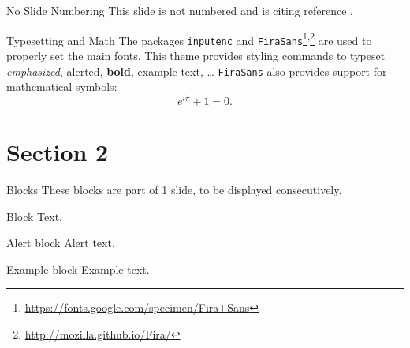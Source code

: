 \documentclass{beamer}
\begin{document}

\begin{frame}[noframenumbering]{No Slide Numbering}
	This slide is not numbered and is citing reference \cite{knuth74}.
\end{frame}


\begin{frame}{Typesetting and Math}
	The packages \texttt{inputenc} and \texttt{FiraSans}\footnote{\url{https://fonts.google.com/specimen/Fira+Sans}}\textsuperscript{,}\footnote{\url{http://mozilla.github.io/Fira/}} are used to properly set the main fonts.
	\vfill
	This theme provides styling commands to typeset \emph{emphasized}, \alert{alerted}, \textbf{bold}, \textcolor{example}{example text}, \dots
	\vfill
	\texttt{FiraSans} also provides support for mathematical symbols:
	\begin{equation*}
		e^{i\pi} + 1 = 0.
	\end{equation*}
\end{frame}


\section{Section 2}


\begin{frame}{Blocks}
	These blocks are part of 1 slide, to be displayed consecutively.
	\begin{block}{Block}
		Text.
	\end{block}
	\pause %
	\begin{alertblock}{Alert block}
		Alert \alert{text}.
	\end{alertblock}
	\pause %
	\begin{exampleblock}{Example block}
		Example \textcolor{example}{text}.
	\end{exampleblock}
\end{frame}

\end{document}
